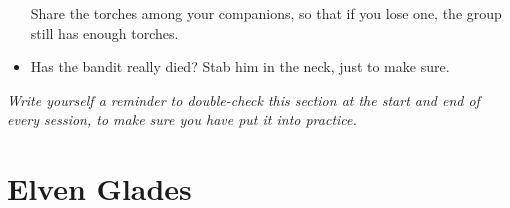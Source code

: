 \begin{multicols}{2}
\begin{itemize}
  Share the torches among your companions, so that if you lose one, the group still has enough torches.
  \item
  Has the bandit really died?
  Stab him in the neck, just to make sure.
\end{itemize}

\emph{Write yourself a reminder to double-check this section at the start and end of every session, to make sure you have put it into practice.}

\end{multicols}

\section[Elves]{Elven Glades \El}
\label{elvenGlades}


